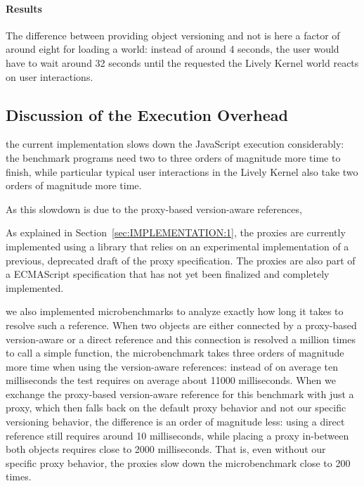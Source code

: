 \paragraph{Results}
The difference between providing object versioning and not is here a factor of around eight for loading a world: instead of around 4 seconds, the user would have to wait around 32 seconds until the requested the Lively Kernel world reacts on user interactions.



\subsection{Discussion of the Execution Overhead}

the current implementation slows down the JavaScript execution considerably: the benchmark programs need two to three orders of magnitude more time to finish, while particular typical user interactions in the Lively Kernel also take two orders of magnitude more time.

As this slowdown is due to the proxy-based version-aware references,

As explained in Section~\ref{sec:IMPLEMENTATION:1}, the proxies are currently implemented using a library that relies on an experimental implementation of a previous, deprecated draft of the proxy specification.
The proxies are also part of a ECMAScript specification that has not yet been finalized and completely implemented.


 we also implemented microbenchmarks to analyze exactly how long it takes to resolve such a reference.
When two objects are either connected by a proxy-based version-aware or a direct reference and this connection is resolved a million times to call a simple function, the microbenchmark takes three orders of magnitude more time when using the version-aware references: instead of on average ten milliseconds the test requires on average about 11000 milliseconds.
When we exchange the proxy-based version-aware reference for this benchmark with just a proxy, which then falls back on the default proxy behavior and not our specific versioning behavior, the difference is an order of magnitude less: using a direct reference still requires around 10 milliseconds, while placing a proxy in-between both objects requires close to 2000 milliseconds.
That is, even without our specific proxy behavior, the proxies slow down the microbenchmark close to 200 times.


